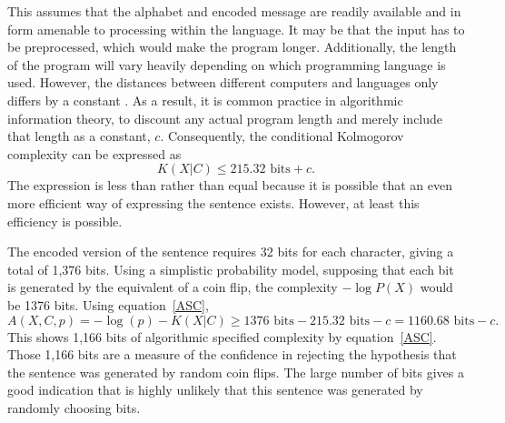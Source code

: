 This assumes that the alphabet and encoded message are readily available and in form amenable to processing within the language.
It may be that the input has to be preprocessed, which would make the program longer.
Additionally, the length of the program will vary heavily depending on which programming language is used.
However, the distances between different computers and languages only differs by a constant \citep{Cover2006}.
As a result, it is common practice in algorithmic information theory, to discount any actual program length and merely include that length 
as a constant, $c$. 
Consequently, the conditional Kolmogorov complexity can be expressed as 
\begin{equation}
    \label{kc.alpha}
    K(X|C) \leq 215.32 \mbox{ bits} + c \mbox{.}
\end{equation}
The expression is less than rather than equal because it is possible that an even more efficient way of expressing the sentence exists.
However, at least this efficiency is possible.

The encoded version of the sentence requires 32 bits for each character, giving a total of 1,376 bits.
Using a simplistic probability model, supposing that each bit is generated by the equivalent of a coin flip,
the complexity $-\log P(X)$ would be 1376 bits.
Using equation~\ref{ASC},
\begin{equation}
    A(X,C,p) = -\log(p) - K(X|C) \geq 1376 \mbox{ bits} - 215.32 \mbox{ bits} - c  = 1160.68 \mbox{ bits} - c \mbox{.}
\end{equation}
This shows 1,166 bits of algorithmic specified complexity by equation~\ref{ASC}.
Those 1,166 bits are a measure of the confidence in rejecting the hypothesis that the sentence was generated by random coin flips.
The large number of bits gives a good indication that is highly unlikely that this sentence was generated by randomly choosing bits.

